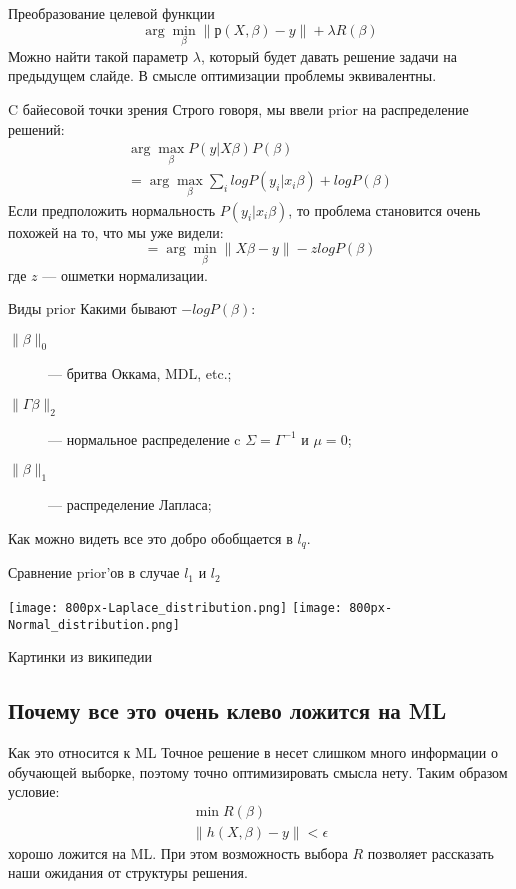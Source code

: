 \documentclass[14pt, fleqn, xcolor={dvipsnames, table}]{beamer}
\begin{document}
\begin{frame}{Преобразование целевой функции}
$$
\arg \min_\beta \| р(X, \beta) - y\| + \lambda R(\beta)
$$
Можно найти такой параметр $\lambda$, который будет давать решение задачи на предыдущем слайде. В смысле оптимизации проблемы эквивалентны.
\end{frame}


\begin{frame}{C байесовой точки зрения}
Строго говоря, мы ввели prior на распределение решений:
$$\begin{array}{l}
\arg \max_\beta P(y|X\beta) P(\beta) \\
= \arg \max_\beta \sum_i log P(y_i|x_i\beta) + log P(\beta)
\end{array}$$
Если предположить нормальность $P(y_i|x_i\beta)$, то проблема становится очень похожей на то, что мы уже видели:
$$
= \arg \min_\beta \|X \beta - y\| - z log P(\beta)
$$
где $z$ --- ошметки нормализации.
\end{frame}

\begin{frame}{Виды prior}
Какими бывают $-log P(\beta)$:
\begin{description}
  \item[$\|\beta\|_0$] --- бритва Оккама, MDL, etc.;
  \item[$\|\Gamma\beta\|_2$] --- нормальное распределение c $\Sigma = \Gamma^{-1}$ и $\mu = 0$;
  \item[$\|\beta\|_1$] --- распределение Лапласа;
\end{description}
Как можно видеть все это добро обобщается в $l_q$.
\end{frame}

\begin{frame}{Сравнение prior'ов в случае $l_1$ и $l_2$}
\begin{center}
\texttt{[image: 800px-Laplace\_distribution.png]} 
\texttt{[image: 800px-Normal\_distribution.png]} 
\end{center}
Картинки из википедии
\end{frame}

\subsection{Почему все это очень клево ложится на ML}
\begin{frame}{Как это относится к ML}
Точное решение в несет слишком много информации о обучающей выборке, поэтому точно оптимизировать смысла нету. Таким образом условие:
$$\begin{array}{l}
\min R(\beta) \\
\|h(X,\beta) - y\| < \epsilon
\end{array}$$
хорошо ложится на ML. При этом возможность выбора $R$ позволяет рассказать наши ожидания от структуры решения.
\end{frame}
\end{document}
